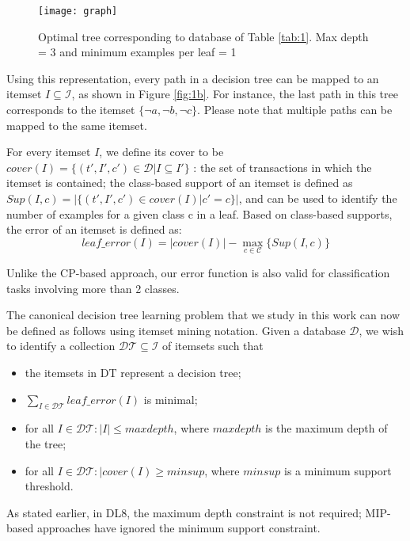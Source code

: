 \begin{figure}
	\centering
	\texttt{[image: graph]}
	\caption{Optimal tree corresponding to database of Table \ref{tab:1}. Max depth = 3 and minimum examples per leaf = 1}
	\label{fig:1}
\end{figure}
Using this representation, every path in a decision tree can be mapped to an itemset $I \subseteq \mathcal{I}$, as shown in Figure \ref{fig:1b}. For instance, the last path in this tree corresponds to the itemset $\{\neg a, \neg b, \neg c\}$. Please note that multiple paths can be mapped
to the same itemset.

For every itemset $I$, we define its cover to be $cover (I) = \{(t', I' , c') \in \mathcal{D} | I \subseteq I'\}$ : the set of transactions in which the itemset is contained; the class-based support of an itemset is defined as $Sup(I, c) = |\{(t', I', c')\in cover (I)| c' = c\}|$, and can be used to identify the number of examples for a given class c in a leaf. Based on class-based supports, the error of an itemset is defined as:
\begin{equation}
	leaf\_error(I) =| cover(I) | - \max_{c\in\mathcal{C}}\{Sup(I,c)\}
	\label{eq:1}
\end{equation}

Unlike the CP-based approach, our error function is also valid for classification tasks involving more than 2 classes.

The canonical decision tree learning problem that we
study in this work can now be defined as follows using itemset mining notation. Given a database $\mathcal{D}$, we wish to identify a collection $\mathcal{DT} \subseteq \mathcal{I}$ of itemsets such that
\begin{itemize}
	\item the itemsets in DT represent a decision tree;
	\item $\sum_{I\in\mathcal{DT}} leaf\_error(I)$ is minimal;
	\item for all $I\in\mathcal{DT} : |I| \le maxdepth$, where $maxdepth$ is the maximum depth of the tree;
	\item for all $I\in\mathcal{DT} :| cover(I) \ge minsup$, where $minsup$ is a minimum support threshold.
\end{itemize}
As stated earlier, in DL8, the maximum depth constraint is not required; MIP-based approaches have ignored the minimum support constraint.
